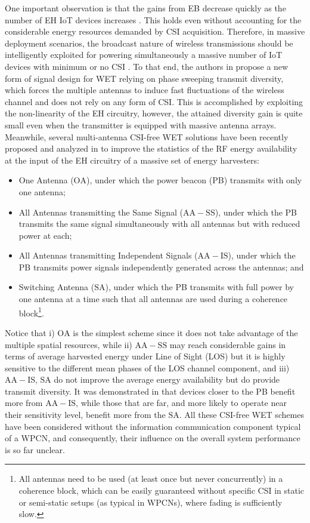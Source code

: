 \documentclass[10pt,journal,a4paper]{IEEEtran}
\begin{document}
	One important observation is that the gains from EB decrease quickly as the number of EH IoT devices increases \cite{Lopez.2019}. This holds even without accounting for the considerable energy resources demanded by CSI acquisition. Therefore, in massive deployment scenarios, the broadcast nature of wireless transmissions should be intelligently exploited for powering simultaneously a massive number of IoT devices with minimum or no CSI \cite{Lopez.2019,LopezMahmood.2020}. To that end, the authors in \cite{Clerckx.2018} propose a new form of signal design for WET relying on phase sweeping transmit diversity, which forces the multiple antennas to induce fast fluctuations of the wireless channel and does not rely on any form of CSI. This is accomplished by exploiting the non-linearity of the EH circuitry, however, the attained diversity gain is quite small even when the transmitter is equipped with massive antenna arrays. Meanwhile, several multi-antenna CSI-free WET solutions have been recently proposed and analyzed in \cite{Lopez.2019_CSI,Lopez.2020} to improve the statistics of the RF energy availability at the input of the EH circuitry of a massive set of energy harvesters:
	\begin{itemize}
		\item One Antenna ($\mathrm{OA}$), under which the power beacon (PB) transmits with only one antenna; 
		\item  All Antennas transmitting the Same Signal ($\mathrm{AA-SS}$), under which the PB transmits the same signal simultaneously with all antennas but with reduced power at each; 
		\item All Antennas transmitting Independent Signals ($\mathrm{AA-IS}$), under which the PB  transmits power signals independently generated across the antennas; and 
		\item Switching Antenna ($\mathrm{SA}$), under which the PB transmits with full power by one antenna at a time such that all antennas are used during a coherence block\footnote{All antennas need to be used (at least once but never concurrently) in a coherence block, which can be easily guaranteed without specific CSI in static or semi-static setups (as typical in WPCNs), where fading is sufficiently slow.}. 
	\end{itemize}
	Notice that i) $\mathrm{OA}$ is the simplest scheme since it does not take advantage of the multiple spatial resources, while ii) $\mathrm{AA-SS}$ may reach considerable gains in terms of average harvested energy under Line of Sight (LOS) but it is highly sensitive to the different mean phases of the LOS channel component,  and iii) $\mathrm{AA-IS}$, $\mathrm{SA}$ do not improve the average energy availability but do provide transmit diversity. It was demonstrated in \cite{Lopez.2020} that devices closer to the PB benefit more from $\mathrm{AA-IS}$, while those that are far, and more likely to operate near their sensitivity level, benefit more from the $\mathrm{SA}$. 
	All these CSI-free WET schemes have been considered without the information communication component typical of a WPCN, and consequently, their influence on the overall system performance is so far unclear. 
\end{document}
